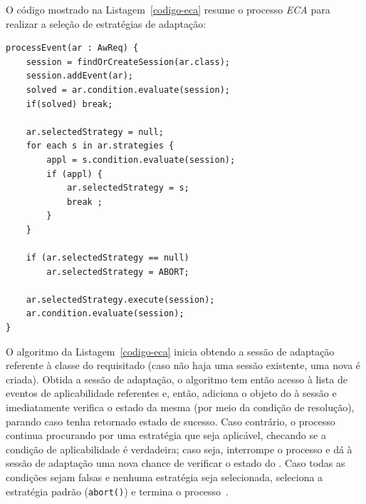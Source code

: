 O código mostrado na Listagem~\ref{codigo-eca} resume o processo \textit{ECA} para realizar a seleção de estratégias de adaptação:

\begin{lstlisting}[caption={Código do processo ECA},label={codigo-eca}]
processEvent(ar : AwReq) {
	session = findOrCreateSession(ar.class);
	session.addEvent(ar);
	solved = ar.condition.evaluate(session);
	if(solved) break;

	ar.selectedStrategy = null;
	for each s in ar.strategies {
		appl = s.condition.evaluate(session);
		if (appl) {
			ar.selectedStrategy = s;
			break ;
		}
	}

	if (ar.selectedStrategy == null)
		ar.selectedStrategy = ABORT;

	ar.selectedStrategy.execute(session);
	ar.condition.evaluate(session);
}
\end{lstlisting}

O algoritmo da Listagem~\ref{codigo-eca} inicia obtendo a sessão de adaptação referente à classe do \awreq requisitado (caso não haja uma sessão existente, uma nova é criada). Obtida a sessão de adaptação, o algoritmo tem então acesso à lista de eventos de aplicabilidade referentes e, então, adiciona o objeto do \awreq à sessão e imediatamente verifica o estado da mesma (por meio da condição de resolução), parando caso tenha retornado estado de sucesso. Caso contrário, o processo continua procurando por uma estratégia que seja aplicável, checando se a condição de aplicabilidade é verdadeira; caso seja, interrompe o processo e dá à sessão de adaptação uma nova chance de verificar o estado do \awreq. Caso todas as condições sejam falsas e nenhuma estratégia seja selecionada, seleciona a estratégia padrão (\texttt{abort()}) e termina o processo~\cite{tesevitor}. 

